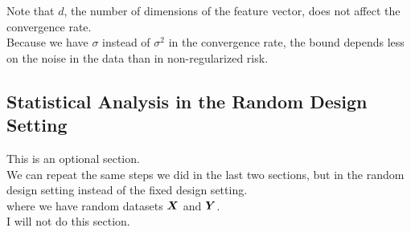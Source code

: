 \documentclass[12pt]{article}
\begin{document}
Note that $d$, the number of dimensions of the feature
vector, does not affect the convergence rate. \\

Because we have $\sigma$ instead of $\sigma^2$
in the convergence rate, the bound depends less
on the noise in the data than in non-regularized 
risk. \\

\newpage

\subsection*{Statistical Analysis in the Random 
Design Setting}

This is an optional section. \\

We can repeat the same steps we did in the last
two sections, but in the random design setting
instead of the fixed design setting. \\
where we have random datasets $\boldsymbol{X}$ and $\boldsymbol{Y}$. \\

I will not do this section. \\

\newpage
\end{document}
